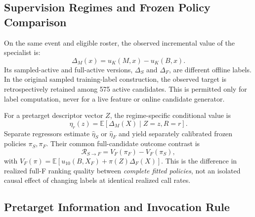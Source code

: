 \documentclass[preprint,12pt]{elsarticle}
\begin{document}
\subsection{Supervision Regimes and Frozen Policy Comparison}
\label{sec:relative-utility}
\label{sec:conditional-utility}

On the same event and eligible roster, the observed incremental value of the specialist is:
\begin{equation}
    \Delta_M(x)=u_K(M,x)-u_K(B,x).
    \label{eq:delta-memory}
\end{equation}
Its sampled-active and full-active versions, $\Delta_S$ and $\Delta_F$, are different offline labels. In the original sampled training-label construction, the observed target is retrospectively retained among 575 active candidates. This is permitted only for label computation, never for a live feature or online candidate generator.

For a pretarget descriptor vector $Z$, the regime-specific conditional value is
\begin{equation}
    \eta_r(z)
    =\mathbb{E}\!\left[\Delta_M(X)\mid Z=z,R=r\right].
    \label{eq:eta}
\end{equation}
Separate regressors estimate $\hat\eta_S$ or $\hat\eta_F$ and yield separately calibrated frozen policies $\pi_S,\pi_F$. Their common full-candidate outcome contrast is
\begin{equation}
    \mathcal{R}_{S\rightarrow F}
    =V_F(\pi_F)-V_F(\pi_S),
    \label{eq:candidate-supervision-transfer}
\end{equation}
with $V_F(\pi)=\mathbb E[u_{10}(B,X_F)+\pi(Z)\Delta_F(X)]$. This is the difference in realized full-F ranking quality between \emph{complete fitted policies}, not an isolated causal effect of changing labels at identical realized call rates.

\subsection{Pretarget Information and Invocation Rule}
\label{sec:framework-estimation}
\label{sec:decision-rule}
\label{sec:framework-controls}
\end{document}
